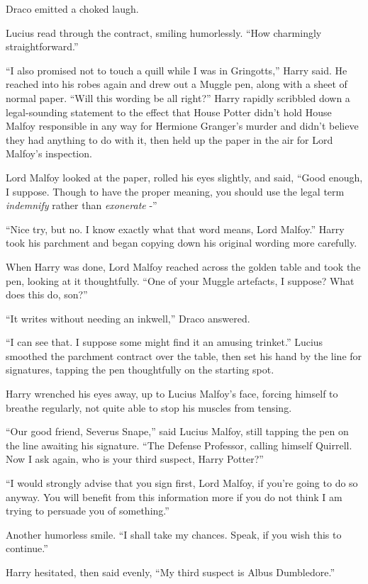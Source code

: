 Draco emitted a choked laugh.

Lucius read through the contract, smiling humorlessly. ``How charmingly
straightforward.''

``I also promised not to touch a quill while I was in Gringotts,'' Harry
said. He reached into his robes again and drew out a Muggle pen, along
with a sheet of normal paper. ``Will this wording be all right?'' Harry
rapidly scribbled down a legal-sounding statement to the effect that
House Potter didn't hold House Malfoy responsible in any way for
Hermione Granger's murder and didn't believe they had anything to do
with it, then held up the paper in the air for Lord Malfoy's inspection.

Lord Malfoy looked at the paper, rolled his eyes slightly, and said,
``Good enough, I suppose. Though to have the proper meaning, you should
use the legal term \emph{indemnify} rather than \emph{exonerate} -''

``Nice try, but no. I know exactly what that word means, Lord Malfoy.''
Harry took his parchment and began copying down his original wording
more carefully.

When Harry was done, Lord Malfoy reached across the golden table and
took the pen, looking at it thoughtfully. ``One of your Muggle
artefacts, I suppose? What does this do, son?''

``It writes without needing an inkwell,'' Draco answered.

``I can see that. I suppose some might find it an amusing trinket.''
Lucius smoothed the parchment contract over the table, then set his hand
by the line for signatures, tapping the pen thoughtfully on the starting
spot.

Harry wrenched his eyes away, up to Lucius Malfoy's face, forcing
himself to breathe regularly, not quite able to stop his muscles from
tensing.

``Our good friend, Severus Snape,'' said Lucius Malfoy, still tapping
the pen on the line awaiting his signature. ``The Defense Professor,
calling himself Quirrell. Now I ask again, who is your third suspect,
Harry Potter?''

``I would strongly advise that you sign first, Lord Malfoy, if you're
going to do so anyway. You will benefit from this information more if
you do not think I am trying to persuade you of something.''

Another humorless smile. ``I shall take my chances. Speak, if you wish
this to continue.''

Harry hesitated, then said evenly, ``My third suspect is Albus
Dumbledore.''

